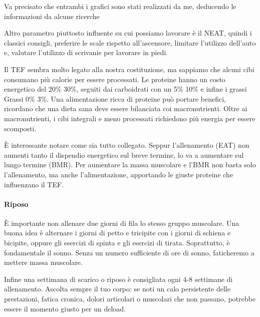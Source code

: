 \documentclass[12pt]{book} %
\begin{document}
Va precisato che entrambi i grafici sono stati realizzati da me, deducendo le informazioni da alcune ricerche 

Altro parametro piuttosto influente su cui possiamo lavorare è il NEAT, quindi i classici consigli, preferire le scale rispetto all'ascensore, limitare l'utilizzo dell'auto e, valutare l'utilizzo di scrivanie per lavorare in piedi.

Il TEF sembra molto legato alla nostra costituzione, ma sappiamo che alcuni cibi consumano più calorie per essere processati. Le proteine hanno un costo energetico del 20\% 30\%, seguiti dai carboidrati con un 5\% 10\% e infine i grassi Grassi 0\% 3\%. Una alimentazione ricca di proteine può portare benefici, ricordano che una dieta sana deve essere bilanciata coi macronutrienti. Oltre ai macronutrienti, i cibi integrali e meno processati richiedono più energia per essere scomposti.

È interessante notare come sia tutto collegato. Seppur l'allenamento (EAT) non aumenti tanto il dispendio energetico sul breve termine, lo va a aumentare sul lungo termine (BMR). Per aumentare la massa muscolare e l'BMR non basta solo l'allenamento, ma anche l'alimentazione, apportando le giuste proteine che influenzano il TEF.

\paragraph{Riposo}
È importante non allenare due giorni di fila lo stesso gruppo muscolare. Una buona idea è alternare i giorni di petto e tricipite con i giorni di schiena e bicipite, oppure gli esercizi di spinta e gli esercizi di tirata.
Soprattutto, è fondamentale il sonno. Senza un numero sufficiente di ore di sonno, faticheremo a mettere massa muscolare.

Infine una settimana di scarico o riposo è consigliata ogni 4-8 settimane di allenamento. Ascolta sempre il tuo corpo: se noti un calo persistente delle prestazioni, fatica cronica, dolori articolari o muscolari che non passano, potrebbe essere il momento giusto per un deload. 
\end{document}
